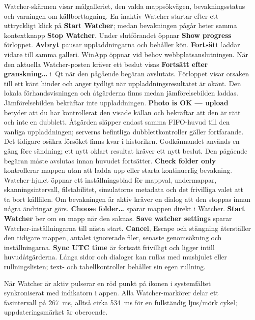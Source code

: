 \documentclass[11pt,a4paper]{article}
\newcommand{\ui}[1]{\textbf{#1}}
\begin{document}
Watcher-skärmen visar målgalleriet, den valda mappsökvägen, bevakningsstatus och
varningen om källborttagning. En inaktiv Watcher startar efter ett
uttryckligt klick på \ui{Start Watcher};
medan bevakningen pågår heter samma kontextknapp \ui{Stop Watcher}.
Under slutförandet öppnar \ui{Show progress} förloppet. \ui{Avbryt} pausar
uppladdningarna och behåller kön. \ui{Fortsätt} laddar vidare till samma
galleri. WinApp öppnar vid behov webbplatsanslutningen.
När den aktuella Watcher-posten kräver ett beslut visas
\ui{Fortsätt efter granskning…} i~Qt när den pågående begäran avslutats.
Förloppet visar orsaken till ett känt hinder och anger tydligt när
uppladdningsresultatet är okänt. Den lokala förhandsvisningen och åtgärderna
finns medan jämförelsebilden laddas. Jämförelsebilden bekräftar inte
uppladdningen.
\ui{Photo is OK — upload} betyder att du
har kontrollerat den visade källan och bekräftar att den är rätt och inte en
dubblett. Åtgärden släpper endast samma FIFO-huvud till den vanliga
uppladdningen; serverns befintliga dubblettkontroller gäller fortfarande.
Det tidigare osäkra försöket finns kvar i historiken. Godkännandet används en
gång före sändning; ett nytt oklart resultat kräver ett nytt beslut. Den
pågående begäran måste avslutas innan huvudet fortsätter.
\ui{Check folder only} kontrollerar mappen utan att ladda upp eller starta
kontinuerlig bevakning. Watcher-hjulet öppnar ett inställningsblad för mappval,
undermappar, skanningsintervall, filstabilitet, simulatorns metadata och det
frivilliga valet att ta bort
källfilen. Om bevakningen är aktiv kräver en dialog att den stoppas innan några
ändringar görs. \ui{Choose folder…} sparar mappen direkt i Watcher.
\ui{Start Watcher} ber om en mapp när den saknas.
\ui{Save watcher settings} sparar Watcher-inställningarna till nästa start.
\ui{Cancel}, Escape och stängning återställer den tidigare mappen,
antalet ignorerade filer, senaste genomsökning och inställningarna.
\ui{Sync UTC time} är fortsatt frivilligt och ligger intill huvudåtgärderna.
Långa sidor och dialoger kan rullas med mushjulet eller rullningslisten;
text- och tabellkontroller behåller sin egen rullning.

När Watcher är aktiv pulserar en röd punkt på ikonen i systemfältet
synkroniserat med indikatorn i appen. Alla Watcher-markörer delar ett
fasintervall på 267~ms, alltså cirka 534~ms för en fullständig ljus/mörk cykel;
uppdateringsmärket är oberoende.
\end{document}

